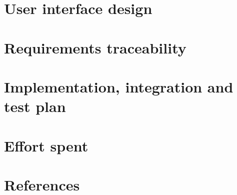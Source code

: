 \documentclass{article}
\begin{document}
\section{User interface design}

\section{Requirements traceability}

\section{Implementation, integration and test plan}
 
\section{Effort spent}

\section{References}
\newpage


 
\end{document}

